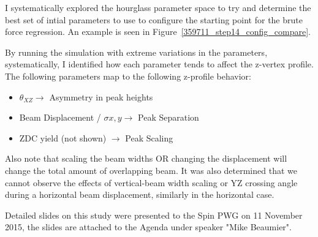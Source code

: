 I systematically explored the hourglass parameter space to try and determine the
best set of intial parameters to use to configure the starting point for the
brute force regression. An example is seen in
Figure~\ref{359711_step14_config_compare}. 


\clearpage

By running the simulation with extreme variations in the parameters,
systematically, I identified how each parameter tends to affect the z-vertex
profile. The following parameters map to the following z-profile behavior:
\begin{itemize}
\item $\theta_{XZ} \rightarrow$ Asymmetry in peak heights
\item Beam Displacement / $\sigma{x,y} \rightarrow$ Peak Separation
\item ZDC yield (not shown) $\rightarrow$ Peak Scaling
\end{itemize}

Also note that scaling the beam widths OR changing the displacement will change
the total amount of overlapping beam. It was also determined that we cannot
observe the effects of vertical-beam width scaling or YZ crossing angle during a
horizontal beam displacement, similarly in the horizontal case.

Detailed slides on this study were presented to the Spin PWG on 11 November
2015, the slides are attached to the Agenda under speaker "Mike Beaumier".

